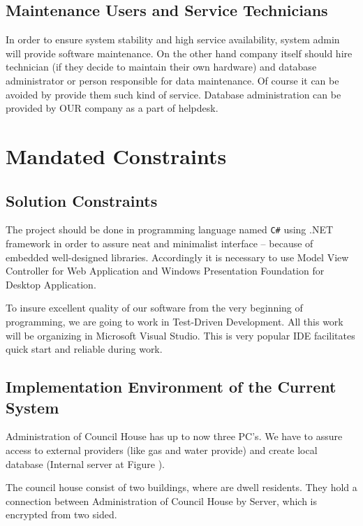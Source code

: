 \documentclass[a4paper,10pt]{report}
\begin{document}
\subsection{Maintenance Users and Service Technicians}

In order to ensure system stability and high service availability, system admin will provide software maintenance. On the other hand company itself should hire technician (if they decide to maintain their own hardware) and database administrator or person responsible for data maintenance. Of course it can be avoided by provide them such kind of service.
Database administration can be provided by OUR company as a part of helpdesk.



\section{Mandated Constraints}
\subsection{Solution Constraints}

The project should be done in programming language named \texttt{C\#} using .NET framework in order to assure neat and minimalist interface – because of embedded well-designed libraries. Accordingly it is necessary to use Model View Controller for Web Application and Windows Presentation Foundation for Desktop Application.

To insure excellent quality of our software from the very beginning of programming, we are going to work in Test-Driven Development. All this work will be organizing in Microsoft Visual Studio. This is very popular IDE facilitates quick start and reliable during work.

\subsection{Implementation Environment of the Current System}

Administration of Council House has up to now three PC’s. We have to assure access to external providers (like gas and water provide) and create local database (Internal server at Figure \label{fig:rys1}).

The council house consist of two buildings, where are dwell residents. They hold a connection between Administration of Council House by Server, which is encrypted from two sided.
\end{document}
